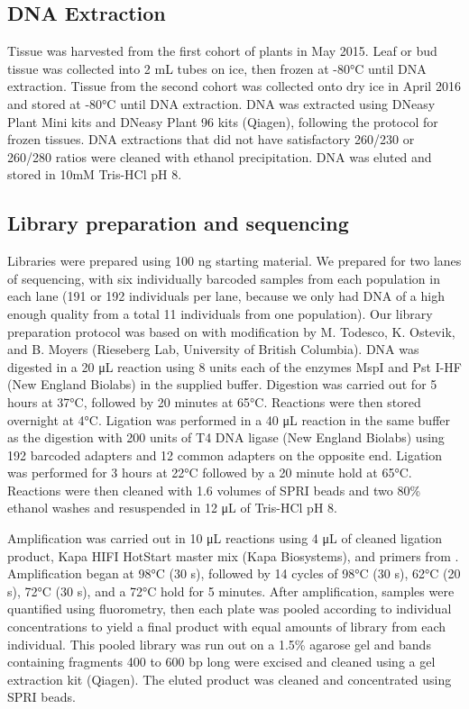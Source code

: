 \documentclass{article}
\begin{document}
\subsection*{DNA Extraction}
Tissue was harvested from the first cohort of plants in May 2015. Leaf or bud tissue was collected into 2 mL tubes on ice, then frozen at -80\si{\degree}C until DNA extraction. Tissue from the second cohort was collected onto dry ice in April 2016 and stored at -80\si{\degree}C until DNA extraction. DNA was extracted using DNeasy Plant Mini kits and DNeasy Plant 96 kits (Qiagen), following the protocol for frozen tissues. DNA extractions that did not have satisfactory 260/230 or 260/280 ratios were cleaned with ethanol precipitation. DNA was eluted and stored in 10mM Tris-HCl pH 8.

\subsection*{Library preparation and sequencing}
Libraries were prepared using 100 ng starting material. We prepared for two lanes of sequencing, with six individually barcoded samples from each population in each lane (191 or 192 individuals per lane, because we only had DNA of a high enough quality from a total 11 individuals from one population). Our library preparation protocol was based on \cite{poland2012development} with modification by M. Todesco, K. Ostevik, and B. Moyers (Rieseberg Lab, University of British Columbia). DNA was digested in a 20 \si{\micro\liter} reaction using 8 units each of the enzymes MspI and Pst I-HF (New England Biolabs) in the supplied buffer. Digestion was carried out for 5 hours at 37\si{\degree}C, followed by 20 minutes at 65\si{\degree}C. Reactions were then stored overnight at 4\si{\degree}C. Ligation was performed in a 40 \si{\micro\liter} reaction in the same buffer as the digestion with 200 units of T4 DNA ligase (New England Biolabs) using 192 barcoded adapters and 12 common adapters on the opposite end. Ligation was performed for 3 hours at 22\si{\degree}C followed by a 20 minute hold at 65\si{\degree}C. Reactions were then cleaned with 1.6 volumes of SPRI beads and two 80\% ethanol washes and resuspended in 12 \si{\micro\liter} of Tris-HCl pH 8.

Amplification was carried out in 10 \si{\micro\liter} reactions using 4 \si{\micro\liter} of cleaned ligation product, Kapa HIFI HotStart master mix (Kapa Biosystems), and primers from \cite{poland2012development}. Amplification began at 98\si{\degree}C (30 s), followed by 14 cycles of 98\si{\degree}C (30 s), 62\si{\degree}C (20 s), 72\si{\degree}C (30 s), and a 72\si{\degree}C hold for 5 minutes. After amplification, samples were quantified using fluorometry, then each plate was pooled according to individual concentrations to yield a final product with equal amounts of library from each individual. This pooled library was run out on a 1.5\% agarose gel and bands containing fragments 400 to 600 bp long were excised and cleaned using a gel extraction kit (Qiagen). The eluted product was cleaned and concentrated using SPRI beads.
\end{document}
